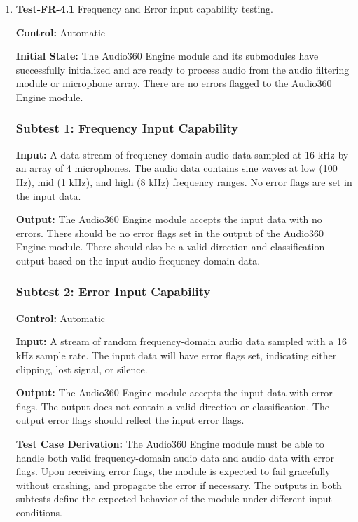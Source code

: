 \documentclass[12pt, titlepage]{article}
\begin{document}
\begin{enumerate}
\item{\textbf{Test-FR-4.1} Frequency and Error input capability testing.\\}

\textbf{Control:} Automatic

\textbf{Initial State:}
The Audio360 Engine module and its submodules have successfully initialized and
are ready to process audio from the audio filtering module or microphone array.
There are no errors flagged to the Audio360 Engine module.

\subsubsection*{Subtest 1: Frequency Input Capability}
\textbf{Input:}
A data stream of frequency-domain audio data sampled at 16 kHz by an array of 
4 microphones. The audio data contains sine waves at low (100 Hz), mid (1 kHz),
and high (8 kHz) frequency ranges. No error flags are set in the input data.

\textbf{Output:}
The Audio360 Engine module accepts the input data with no errors. There should
be no error flags set in the output of the Audio360 Engine module. There should
also be a valid direction and classification output based on the input audio 
frequency domain data.

\subsubsection*{Subtest 2: Error Input Capability}

\textbf{Control:} Automatic

\textbf{Input:}
A stream of random frequency-domain audio data sampled with a 16 kHz sample
rate. The input data will have error flags set, indicating either 
clipping, lost signal, or silence.

\textbf{Output:}
The Audio360 Engine module accepts the input data with error flags. The output
does not contain a valid direction or classification. The output error flags
should reflect the input error flags.

\textbf{Test Case Derivation:}
The Audio360 Engine module must be able to handle both valid frequency-domain
audio data and audio data with error flags. Upon receiving error flags, the 
module is expected to fail gracefully without crashing, and propagate the error
if necessary. The outputs in both subtests define the expected behavior of the
module under different input conditions.


\end{enumerate}
\end{document}

